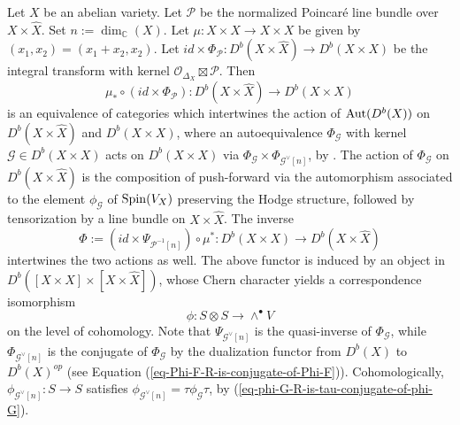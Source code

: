 \documentclass[12pt]{amsart}
\numberwithin{equation}{subsection}
\theoremstyle{plain}
\theoremstyle{definition}
\newtheorem{question}[thm]{Question}
\newcommand{\CC}{{\mathbb C}}
\newcommand{\F}{{\mathcal F}}
\newcommand{\G}{{\mathcal G}}
\renewcommand{\P}{{\mathcal P}}
\newcommand{\Spin}{{\rm Spin}}
\newcommand{\StructureSheaf}[1]{{\mathcal O}_{#1}}
\newcommand{\Aut}{{\rm Aut}}
\begin{document}

Let $X$ be an abelian variety. Let $\P$ be the normalized Poincar\'{e} line bundle over $X\times \hat{X}$.
Set $n:=\dim_\CC(X)$.
Let $\mu:X\times X\rightarrow X\times X$ be given by $(x_1,x_2)=(x_1+x_2,x_2)$. 
Let $id\times \Phi_\P: D^b(X\times\hat{X})\rightarrow D^b(X\times X)$
be the integral transform with kernel $\StructureSheaf{\Delta_X}\boxtimes \P$. Then
\begin{equation}
\label{eq-Orlov-derived-equivalence-to-XxX-from-X-times-hat-X}
\mu_*\circ (id\times \Phi_\P):D^b(X\times\hat{X})\rightarrow D^b(X\times X)
\end{equation} 
is an equivalence of categories 
which intertwines the action of $\Aut(D^b(X))$ on $D^b(X\times\hat{X})$ and $D^b(X\times X)$, where an autoequivalence $\Phi_\G$ with kernel $\G\in D^b(X\times X)$ acts on $D^b(X\times X)$ via $\Phi_\G\times \Phi_{\G^\vee[n]}$, by \cite[Cor.  9.37]{huybrechts-derived-categories-book}. 
The action of $\Phi_\G$ on $D^b(X\times\hat{X})$ is the composition of push-forward via the automorphism  associated to the element $\phi_\G$ of $\Spin(V_X)$ preserving the Hodge structure, followed by tensorization by a line bundle on $X\times\hat{X}$.
The inverse 
\begin{equation}
\label{eq-Orlov-derived-equivalence-from-XxX-to-X-times-hat-X}
\Phi:=(id\times \Psi_{\P^{-1}[n]})\circ \mu^* : D^b(X\times X) \rightarrow D^b(X\times\hat{X})
\end{equation}
 intertwines the two actions as well.
 The above functor is induced by an object in $D^b([X\times X]\times [X\times \hat{X}])$, whose Chern character yields a correspondence isomorphism 
 \begin{equation}
 \label{eq-Orlov-cohomological-isomorphism}
 \phi:S\otimes S \rightarrow \wedge^\bullet V
 \end{equation}
 on the level of cohomology.
 Note that $\Psi_{\G^\vee[n]}$ is the quasi-inverse of $\Phi_\G$, while $\Phi_{\G^\vee[n]}$ 
 is the conjugate of $\Phi_\G$ by the dualization functor from $D^b(X)$ to $D^b(X)^{op}$ (see Equation (\ref{eq-Phi-F-R-is-conjugate-of-Phi-F})).
Cohomologically, $\phi_{\G^\vee[n]}:S\rightarrow S$ satisfies $\phi_{\G^\vee[n]}=\tau\phi_\G\tau$, by (\ref{eq-phi-G-R-is-tau-conjugate-of-phi-G}).
\end{document}
